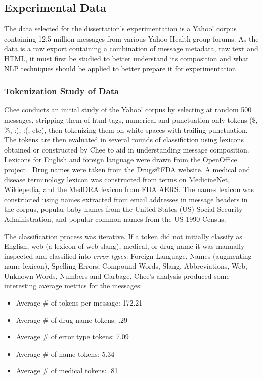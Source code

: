 \documentclass[twoside,11pt]{article}
\begin{document}
\subsection{Experimental Data}
The data selected for the dissertation's experimentation is a Yahoo! corpus containing 12.5 million messages from various Yahoo Health group forums. As the data is a raw export containing a combination of message metadata, raw text and HTML, it must first be studied to better understand its composition and what NLP techniques should be applied to better prepare it for experimentation.

\subsubsection{Tokenization Study of Data}
Chee conducts an initial study of the Yahoo! corpus by selecting at random 500 messages, stripping them of html tags, numerical and punctuation only tokens (\$, \%, :), :(, etc), then tokenizing them on white spaces with trailing punctuation. The tokens are then evaluated in several rounds of classifiction using lexicons obtained or constructed by Chee to aid in understanding message composition. Lexicons for English and foreign language were drawn from the OpenOffice project \citep{OpenOffice}. Drug names were taken from the Drugs@FDA website. A medical and disease terminology lexicon was constructed from terms on MedicineNet, Wikiepedia, and the MedDRA lexicon from FDA AERS. The names lexicon was constructed using names extracted from email addresses in message headers in the corpus, popular baby names from the United States (US) Social Security Administration, and popular common names from the US 1990 Census.

The classification process was iterative. If a token did not initially classify as English, web (a lexicon of web slang), medical, or drug name it was manually inspected and classified into \textit{error types}:  Foreign Language, Names (augmenting name lexicon), Spelling Errors, Compound Words, Slang, Abbreviations, Web, Unknown Words, Numbers and Garbage. Chee's analysis produced some interesting average metrics for the messages:

\begin{itemize}
  \item Average # of tokens per message:  172.21
  \item Average # of drug name tokens: .29
  \item Average # of error type tokens: 7.09
  \item Average # of name tokens: 5.34
  \item Average # of medical tokens: .81
\end{itemize}
\end{document}
